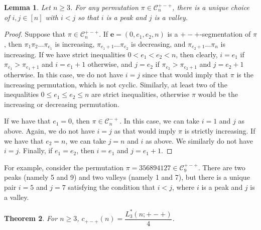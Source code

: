 \documentclass[12pt]{article}
\newcommand{\C}{\mathcal{C}}
\newcommand{\e}{\mathbf{e}}
\theoremstyle{plain}
\newtheorem{theorem}{Theorem}
\newtheorem{lemma}[theorem]{Lemma}
\theoremstyle{definition}
\begin{document}
\begin{lemma}
 Let $n\geq 3$. For any permutation $\pi\in\C_n^{+-+}$, there is a unique choice of $i,j \in [n]$ with $i<j$ so that $i$ is a peak and $j$ is a valley.
\end{lemma}

\begin{proof}
Suppose that $\pi\in \C_n^{+-+}$.  If $\e=(0, e_1, e_2, n)$ is a $+-+$-segmentation of $\pi$, then $\pi_1\pi_2\ldots\pi_{e_1}$ is increasing, $\pi_{e_1+1}\ldots \pi_{e_2}$ is decreasing, and $\pi_{e_2+1}\ldots \pi_n$ is increasing. If we have strict inequalities $0<e_1<e_2<n$, then clearly, $i=e_1$ if $\pi_{e_1}>\pi_{e_1+1}$ and $i=e_1+1$ otherwise, and $j=e_2$ if $\pi_{e_2}>\pi_{e_2+1}$ and $j=e_2+1$ otherwise. In this case, we do not have $i=j$ since that would imply that $\pi$ is the increasing permutation, which is not cyclic. Similarly, at least two of the inequalities $0\leq e_1\leq e_2\leq n$ are strict inequalities, otherwise $\pi$ would be the increasing or decreasing permutation.
 
If we have that $e_1=0$, then $\pi \in \C_n^{-+}$. In this case, we can take $i=1$ and $j$ as above. Again, we do not have $i=j$ as that would imply $\pi$ is strictly increasing. If we have that $e_2=n$, we can take $j=n$ and $i$ as above. We similarly do not have $i=j$. Finally, if $e_1=e_2$, then $i=e_1$ and $j=e_1+1$. 
\end{proof}

For example, consider the permutation $\pi = 356894127 \in \C_9^{+-+}$. There are two peaks (namely 5 and 9) and two valleys (namely 1 and 7), but there is a unique pair $i=5$ and $j=7$ satisfying the condition that $i<j$, where $i$ is a peak and $j$ is a valley. 



\begin{theorem}\label{COUNTING SIGMA3}
For $n \geq 3$, $c_{+-+}(n)=\dfrac{L_3^*(n;+-+)}{4}$.
\end{theorem}
\end{document}
